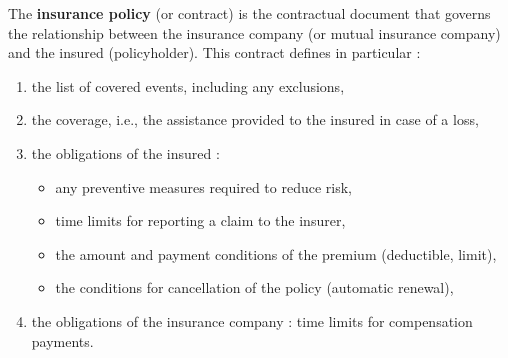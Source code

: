 \begin{f}
	
	The \textbf{insurance policy} (or contract) is the contractual document that governs the relationship between the insurance company (or mutual insurance company) and the insured (policyholder). 
	This contract defines in particular :
	
	\begin{enumerate}
		\item the list of covered events, including any exclusions,
		\item the coverage, i.e., the assistance provided to the insured in case of a loss,
		\item the obligations of the insured :
		\begin{itemize}
			\item any preventive measures required to reduce risk,
			\item time limits for reporting a claim to the insurer,
			\item the amount and payment conditions of the premium (deductible, limit),
			\item the conditions for cancellation of the policy (automatic renewal),
		\end{itemize}
		\item the obligations of the insurance company : time limits for compensation payments.
		
	\end{enumerate}
	
\end{f}
